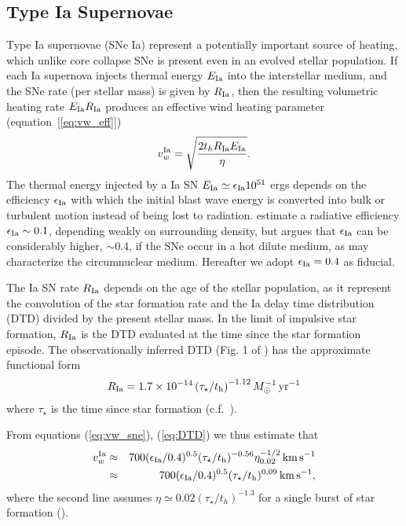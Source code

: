 \documentclass[usenatbib,fleqn]{mn2e}
\newcommand{\RateIa}{R_{\rm Ia}}
\begin{document}
\subsection{Type Ia Supernovae} 

Type Ia supernovae (SNe Ia) represent a potentially important source of heating, which unlike core collapse SNe is present even in an evolved stellar population.  If each Ia supernova injects thermal energy $E_{\rm Ia}$ into the interstellar medium, and the SNe rate (per stellar mass) is given by $R_{\rm   Ia}$, then the resulting volumetric heating rate $E_{\rm Ia}R_{\rm  Ia}$ produces an effective wind heating parameter (equation~[\ref{eq:vw_eff}]) \begin{align} v_{w}^{\rm Ia} =\sqrt{\frac{2 t_h R_{\rm Ia}
E_{\rm Ia}}{\eta}} \label{eq:vw_sne}.
\end{align} The thermal energy injected by a Ia SN $E_{\rm Ia} \simeq
\epsilon_{\rm Ia} 10^{51}$ ergs depends on the efficiency $\epsilon_{\rm Ia}$
with which the initial blast wave energy is converted into bulk or turbulent
motion instead of being lost to radiation.  \cite{Thornton+98}
estimate a radiative efficiency $\epsilon_{\rm Ia} \sim 0.1$,
depending weakly on surrounding density, but \citet{Sharma+14} argues
that $\epsilon_{\rm Ia}$ can be considerably higher, $\sim 0.4$, if
the SNe occur in a hot dilute medium, as may characterize the circumnuclear medium.  Hereafter we adopt $\epsilon_{\rm Ia} = 0.4$ as fiducial.

The Ia SN rate $\RateIa$ depends on the age of the stellar population, as it represent the convolution of the star formation rate and the Ia delay time distribution (DTD) divided by the present stellar mass.  In
the limit of impulsive star formation, $\RateIa$ is the DTD evaluated at the time since the star formation episode.  The observationally inferred DTD (Fig. 1 of \citealt{MaozMannucci+:2012a}) has the
approximate functional form \begin{align}
  R_{\rm Ia} =1.7\times 10^{-14}\left(\tau_{\star}/t_{\rm
      h}\right)^{-1.12} M_{\odot}^{-1}\,{\rm yr^{-1}}
\label{eq:DTD}
  \end{align}
  where $\tau_{\star}$ is the time since star formation
  (c.f.~\citealt{Scannapieco&Bildsten05}). 

From equations (\ref{eq:vw_sne}), (\ref{eq:DTD}) we thus estimate that 
  \begin{eqnarray} 
    v_{w}^{\rm Ia} &\approx& 700(\epsilon_{\rm
      Ia}/0.4)^{0.5}(\tau_{\star}/t_{\rm h})^{-0.56}\eta_{0.02}^{-1/2}\,{\rm km
      \,s^{-1}} \nonumber \\
&\approx& 700(\epsilon_{\rm
      Ia}/0.4)^{0.5}(\tau_{\star}/t_{\rm h})^{0.09}\,{\rm km
      \,s^{-1}},
\label{eq:vIa}
  \end{eqnarray}
where the second line assumes $\eta\simeq 0.02 (\tau_{\star}/t_h)^{-1.3}$ for a single burst of star formation (\citealt{Ciotti+91}).
\end{document}
